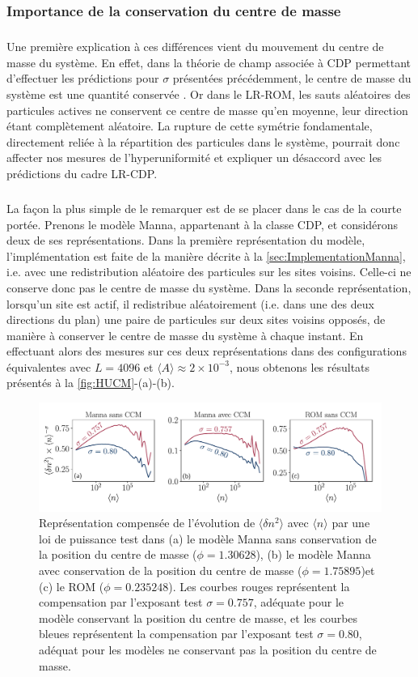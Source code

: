 \subsubsection{Importance de la conservation du centre de masse}

\subparagraph{}Une première explication à ces différences vient du mouvement du centre de masse du système. En effet, dans la théorie de champ associée à CDP permettant d'effectuer les prédictions pour $\sigma$ présentées précédemment, le centre de masse du système est une quantité conservée \cite{wiese_blabla}. Or dans le LR-ROM, les sauts aléatoires des particules actives ne conservent ce centre de masse qu'en moyenne, leur direction étant complètement aléatoire. La rupture de cette symétrie fondamentale, directement reliée à la répartition des particules dans le système, pourrait donc affecter nos mesures de l'hyperuniformité et expliquer un désaccord avec les prédictions du cadre LR-CDP.

\subparagraph{}La façon la plus simple de le remarquer est de se placer dans le cas de la courte portée. Prenons le modèle Manna, appartenant à la classe CDP, et considérons deux de ses représentations. Dans la première représentation du modèle, l'implémentation est faite de la manière décrite à la \autoref{sec:ImplementationManna}, i.e. avec une redistribution aléatoire des particules sur les sites voisins. Celle-ci ne conserve donc pas le centre de masse du système. Dans la seconde représentation, lorsqu'un site est actif, il redistribue aléatoirement (i.e. dans une des deux directions du plan) une paire de particules sur deux sites voisins opposés, de manière à conserver le centre de masse du système à chaque instant. En effectuant alors des mesures sur ces deux représentations dans des configurations équivalentes avec $L=4096$ et $\langle A \rangle \approx 2\times 10^{-3}$, nous obtenons les résultats présentés à la \autoref{fig:HUCM}-(a)-(b).

\begin{figure}[h]
	\centering
	\includegraphics[width=\textwidth]{Chapitre2/Figures/Hyperuniformity/ImportanceCMHU.pdf}
	\caption{Représentation compensée de l'évolution de $\langle \delta n^2 \rangle$ avec $\langle n \rangle$ par une loi de puissance test dans (a) le modèle Manna sans conservation de la position du centre de masse ($\phi = 1.30628$), (b) le modèle Manna avec conservation de la position du centre de masse ($\phi = 1.75895$)et (c) le ROM ($\phi = 0.235248$). Les courbes rouges représentent la compensation par l'exposant test $\sigma = 0.757$, adéquate pour le modèle conservant la position du centre de masse, et les courbes bleues représentent la compensation par l'exposant test $\sigma = 0.80$, adéquat pour les modèles ne conservant pas la position du centre de masse.}
	\label{fig:HUCM}
\end{figure}

